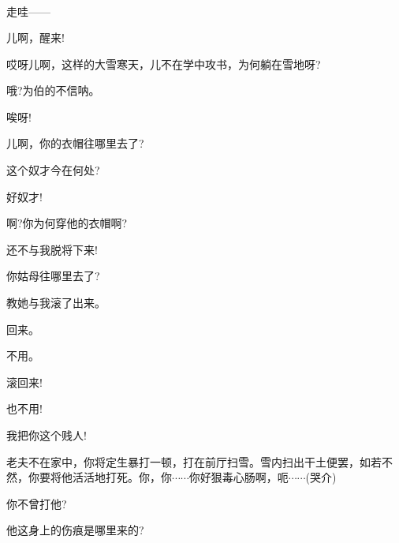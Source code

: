 \newpage\hspace{30pt}~

{%

\subsubsection{\large{}}

{\vspace{5pt}}

{走哇------}\hspace{10pt}~



{儿啊，醒来!}

{哎呀儿啊，这样的大雪寒天，儿不在学中攻书，为何躺在雪地呀?}

{哦?为伯的不信呐。}

{唉呀!}\hspace{20pt}~


{儿啊，你的衣帽往哪里去了?}

{这个奴才今在何处?}

{好奴才!}\hspace{10pt}~

{啊?你为何穿他的衣帽啊?}

{还不与我脱将下来!}

{你姑母往哪里去了?}

{教她与我滚了出来。}

{回来。}

{不用。}

{滚回来!}\hspace{10pt}~

{也不用!}\hspace{10pt}~

{我把你这个贱人!}

{老夫不在家中，你将定生暴打一顿，打在前厅扫雪。雪内扫出干土便罢，如若不然，你要将他活活地打死。你，你$\cdots{}\cdots{}$你好狠毒心肠啊，呃$\cdots{}\cdots{}$({\hwfs 哭}{\hwfs 介})}

{你不曾打他?}

{他这身上的伤痕是哪里来的?}

}
